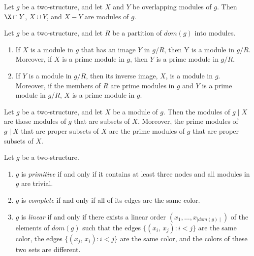 \begin{mytheo}
    \label{thm:2-1}
    Let $g$ be a two-structure, and let $X$ and $Y$ be overlapping modules of $g$.
    Then $\X \cap Y$, $X \cup Y$, and $X - Y$ are modules of $g$.
\end{mytheo}

\begin{mytheo}
    \label{thm:2-2}
    Let $g$ be a two-structure, and let $R$ be a partition of $dom(g)$ into modules.
    \begin{enumerate}
        \item If $X$ is a module in $g$ that has an image $Y$ in $g / R$, then Y is a module in $g / R$.
        Moreover, if $X$ is a prime module in $g$, then $Y$ is a prime module in $g / R$.
        \item If $Y$ is a module in $g / R$, then its inverse image, $X$, is a module in $g$.
        Moreover, if the members of $R$ are prime modules in $g$ and $Y$ is a prime module in $g / R$, $X$ is a prime module in $g$.
    \end{enumerate}
\end{mytheo}

\begin{mylem}
    \label{lem:2-3}
    Let $g$ be a two-structure, and let $X$ be a module of $g$.
    Then the modules of $g \mid X$ are those modules of $g$ that are subsets of $X$.
    Moreover, the prime modules of $g \mid X$ that are proper subsets of $X$ are the prime modules of $g$ that are proper subsets of $X$.
\end{mylem}


\begin{mydef}
    \label{def:2-4}
    Let $g$ be a two-structure.
    \begin{enumerate}
        \item $g$ is \textit{primitive} if and only if it contains at least three nodes and all modules in $g$ are trivial.
        \item $g$ is \textit{complete} if and only if all of its edges are the same color.
        \item $g$ is \textit{linear} if and only if there exists a linear order $(x_1, \dots, x_{\mid dom(g) \mid})$ of the elements of $dom(g)$ such that the edges $\{(x_i,\, x_j): i < j\}$ are the same color, the edges $\{(x_j,\, x_i): i < j\}$ are the same color, and the colors of these two sets are different.
    \end{enumerate}
\end{mydef}

